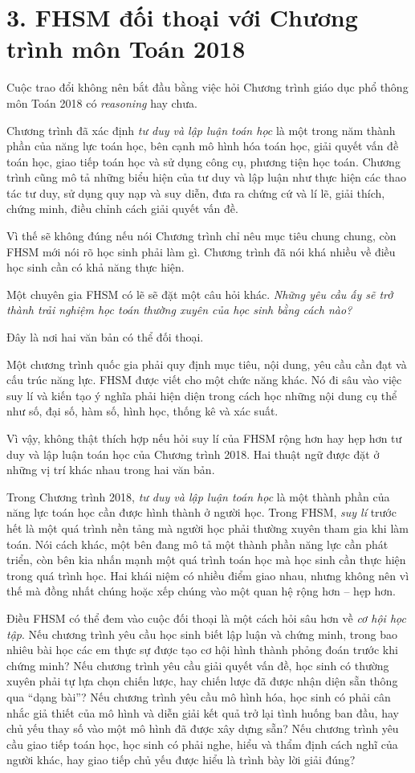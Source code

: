\section*{3. FHSM đối thoại với Chương trình môn Toán 2018}

Cuộc trao đổi không nên bắt đầu bằng việc hỏi Chương trình giáo dục phổ thông môn Toán 2018 có \emph{reasoning} hay chưa.

Chương trình đã xác định \emph{tư duy và lập luận toán học} là một trong năm thành phần của năng lực toán học, bên cạnh mô hình hóa toán học, giải quyết vấn đề toán học, giao tiếp toán học và sử dụng công cụ, phương tiện học toán. Chương trình cũng mô tả những biểu hiện của tư duy và lập luận như thực hiện các thao tác tư duy, sử dụng quy nạp và suy diễn, đưa ra chứng cứ và lí lẽ, giải thích, chứng minh, điều chỉnh cách giải quyết vấn đề.

Vì thế sẽ không đúng nếu nói Chương trình chỉ nêu mục tiêu chung chung, còn FHSM mới nói rõ học sinh phải làm gì. Chương trình đã nói khá nhiều về điều học sinh cần có khả năng thực hiện.

Một chuyên gia FHSM có lẽ sẽ đặt một câu hỏi khác. \emph{Những yêu cầu ấy sẽ trở thành trải nghiệm học toán thường xuyên của học sinh bằng cách nào?}

Đây là nơi hai văn bản có thể đối thoại.

Một chương trình quốc gia phải quy định mục tiêu, nội dung, yêu cầu cần đạt và cấu trúc năng lực. FHSM được viết cho một chức năng khác. Nó đi sâu vào việc suy lí và kiến tạo ý nghĩa phải hiện diện trong cách học những nội dung cụ thể như số, đại số, hàm số, hình học, thống kê và xác suất.

Vì vậy, không thật thích hợp nếu hỏi suy lí của FHSM rộng hơn hay hẹp hơn tư duy và lập luận toán học của Chương trình 2018. Hai thuật ngữ được đặt ở những vị trí khác nhau trong hai văn bản.

Trong Chương trình 2018, \emph{tư duy và lập luận toán học} là một thành phần của năng lực toán học cần được hình thành ở người học. Trong FHSM, \emph{suy lí} trước hết là một quá trình nền tảng mà người học phải thường xuyên tham gia khi làm toán. Nói cách khác, một bên đang mô tả một thành phần năng lực cần phát triển, còn bên kia nhấn mạnh một quá trình toán học mà học sinh cần thực hiện trong quá trình học. Hai khái niệm có nhiều điểm giao nhau, nhưng không nên vì thế mà đồng nhất chúng hoặc xếp chúng vào một quan hệ rộng hơn -- hẹp hơn.

Điều FHSM có thể đem vào cuộc đối thoại là một cách hỏi sâu hơn về \emph{cơ hội học tập}. Nếu chương trình yêu cầu học sinh biết lập luận và chứng minh, trong bao nhiêu bài học các em thực sự được tạo cơ hội hình thành phỏng đoán trước khi chứng minh? Nếu chương trình yêu cầu giải quyết vấn đề, học sinh có thường xuyên phải tự lựa chọn chiến lược, hay chiến lược đã được nhận diện sẵn thông qua ``dạng bài''? Nếu chương trình yêu cầu mô hình hóa, học sinh có phải cân nhắc giả thiết của mô hình và diễn giải kết quả trở lại tình huống ban đầu, hay chủ yếu thay số vào một mô hình đã được xây dựng sẵn? Nếu chương trình yêu cầu giao tiếp toán học, học sinh có phải nghe, hiểu và thẩm định cách nghĩ của người khác, hay giao tiếp chủ yếu được hiểu là trình bày lời giải đúng?

